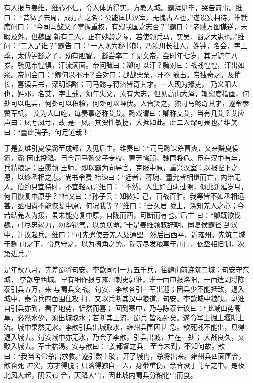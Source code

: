 有人报与姜维，维心不信，令人体访得实，方教入城。霸拜见毕，哭告前事。维曰：
“昔微子去周，成万古之名：公能匡扶汉室，无愧古人也。”遂设宴相待。维就席问曰：
“今司马懿父子掌握重权，有窥我国之志否？”霸曰：“老贼方图谋逆，未暇及外。但魏国
新有二人，正在妙龄之际，若使领兵马，实吴、蜀之大患也。”维问：“二人是谁？”霸告
曰：“一人现为秘书郎，乃颍川长社人，姓钟，名会，字士季，太傅钟繇之子，幼有胆智。
繇尝率二子见文帝，会时年七岁，其兄毓年八岁。毓见帝惶惧，汗流满面。帝问毓曰：卿何
以汗？毓对曰：战战惶惶，汗出如浆。帝问会曰：“卿何以不汗？会对曰：战战栗栗，汗不
敢出。帝独奇之。及稍长，喜读兵书，深明韬略；司马懿与蒋济皆奇其才。一人现为掾吏，
乃义阳人也，姓邓，名艾，字士载，幼年失父，素有大志，但见高山大泽，辄窥度指画，何
处可以屯兵，何处可以积粮，何处可以埋伏。人皆笑之，独司马懿奇其才，遂令参赞军机。
艾为人口吃，每奏事必称艾艾。懿戏谓曰：卿称艾艾，当有几艾？艾应声曰：凤兮凤兮，故
是一凤。其资性敏捷，大抵如此。此二人深可畏也。”维笑曰：“量此孺子，何足道哉！”

于是姜维引夏侯霸至成都，入见后主。维奏曰：“司马懿谋杀曹爽，又来赚夏侯霸，霸
因此投降。目今司马懿父子专权，曹芳懦弱，魏国将危。臣在汉中有年，兵精粮足；臣愿领
王师，即以霸为向导官，克服中原，重兴汉室：以报陛下之恩，以终丞相之志。”尚书令费
祎谏曰：“近者，蒋琬、董允皆相继而亡，内治无人。伯约只宜待时，不宜轻动。”维曰：
“不然。人生如白驹过隙，似此迁延岁月，何日恢复中原乎？”祎又曰：“孙子云：知彼知
己，百战百胜。我等皆不如丞相远甚，丞相尚不能恢复中原，何况我等？”维曰：“吾久居
陇上，深知羌人之心；今若结羌人为援，虽未能克复中原，自陇而西，可断而有也。”后主
曰：“卿既欲伐魏，可尽忠竭力，勿堕锐气，以负朕命。”于是姜维领敕辞朝，同夏侯霸径
到汉中，计议起兵。维曰：“可先遣使去羌人处通盟，然后出西平，近雍州。先筑二城于麴
山之下，令兵守之，以为掎角之势。我等尽发粮草于川口，依丞相旧制，次第进兵。”

是年秋八月，先差蜀将句安、李歆同引一万五千兵，往麴山前连筑二城：句安守东城，
李歆守西城。早有细作报与雍州刺史郭淮。淮一面申报洛阳，一面遣副将陈泰引兵五万，来
与蜀兵交战。句安、李歆各引一军出迎；因兵少不能抵敌，退入城中。泰令兵四面围住攻
打，又以兵断其汉中粮道。句安、李歆城中粮缺。郭淮自引兵亦到，看了地势，忻然而喜；
回到寨中，乃与陈泰计议曰：“此城山势高阜，必然水少，须出城取水；若断其上流，蜀兵
皆渴死矣。”遂令军士掘土堰断上流。城中果然无水。李歆引兵出城取水，雍州兵围困甚
急。歆死战不能出，只得退入城去。句安城中亦无水，乃会了李歆，引兵出城，并在一处；
大战良久，又败入城去。军士枯渴。安与歆曰：“姜都督之兵，至今未到，不知何故。”歆
曰：“我当舍命杀出求救。”遂引数十骑，开了城门，杀将出来。雍州兵四面围合，歆奋死
冲突，方才得脱；只落得独自一人，身带重伤，余皆没于乱军之中。是夜北风大起，阴云布
合，天降大雪，因此城内蜀兵分粮化雪而食。

